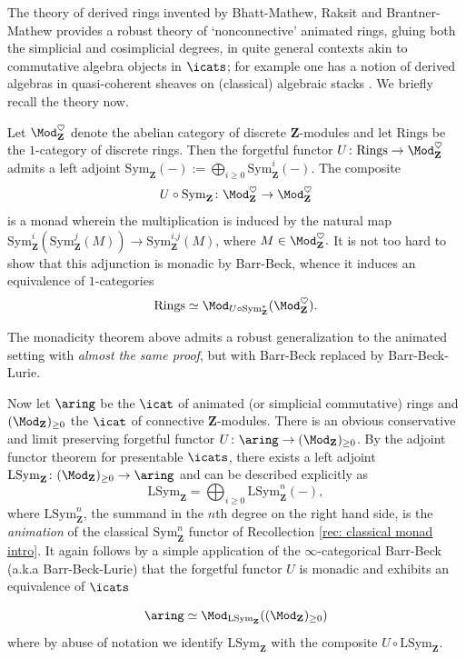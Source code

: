 \documentclass[10pt,reqno]{amsart}
\numberwithin{equation}{section}
\newcommand{\ZZ}{\mathbf{Z}}
\newcommand{\Sym}{\mathrm{Sym}}
\renewcommand{\L}{\mathrm{L}}
\begin{document}
The theory of derived rings invented by Bhatt-Mathew, Raksit \cite{Rak20} and Brantner-Mathew \cite{BrantnerMathewActa_toappear} provides a robust theory of `nonconnective' animated rings, gluing both the simplicial and cosimplicial degrees, in quite general contexts akin to commutative algebra objects in $\icats$; for example one has a notion of derived algebras in quasi-coherent sheaves on (classical) algebraic stacks \cite[Appendix A.2]{KubrakPrikhodko2024PadicHodgeArtinStacks}. We briefly recall the theory now.



\begin{recollection}\label{rec: classical monad intro}
    Let $\Mod_{\ZZ}^\heartsuit$ denote the abelian category of discrete $\ZZ$-modules and let $\mathrm{Rings}$ be the $1$-category of discrete rings. Then the forgetful functor $U\colon \mathrm{Rings}\to  \Mod_{\ZZ}^\heartsuit$ admits a left adjoint $\Sym_{\ZZ}(-):=\bigoplus_{i\geq 0} \Sym^i_{\ZZ}(-).$ 
    The composite $$U\circ \Sym_{\ZZ} \colon \Mod_{\ZZ}^\heartsuit\to \Mod_{\ZZ}^\heartsuit$$ is a monad wherein the multiplication is induced by the natural map $\Sym^i_{\ZZ}(\Sym_{\ZZ}^j(M))\to \Sym_{\ZZ}^{i.j}(M)$, where $M\in \Mod_{\ZZ}^\heartsuit.$
    It is not too hard to show that this adjunction is monadic by Barr-Beck, whence it induces an equivalence of $1$-categories 
    $$\mathrm{Rings}\simeq \Mod_{U\circ \Sym_{\ZZ}^*}(\Mod_{\ZZ}^\heartsuit).$$

\end{recollection}

The monadicity theorem above admits a robust generalization to the animated setting with \emph{almost the same proof}, but with Barr-Beck replaced by Barr-Beck-Lurie.

\begin{recollection}\label{rec: animated monadicity intro}
    Now let $\aring$ be the $\icat$ of animated (or simplicial commutative) rings and $(\Mod_\ZZ)_{\geq 0}$ the $\icat$ of connective $\ZZ$-modules. There is an obvious conservative and limit preserving forgetful functor $U\colon \aring \to (\Mod_\ZZ)_{\geq 0}$. By the adjoint functor theorem for presentable $\icats$, there exists a left adjoint $\L\Sym_{\ZZ}\colon (\Mod_\ZZ)_{\geq 0}\to \aring$ and can be described explicitly as $$\L\Sym_{\ZZ}=\bigoplus_{i\geq 0} \L\Sym^n_{\ZZ}(-),$$ where $\L\Sym^n_{\ZZ}$, the summand in the $n$th degree on the right hand side, is the \emph{animation} of the classical $\Sym_{\ZZ}^n$ functor of Recollection \ref{rec: classical monad intro}.
    It again follows by a simple application of the $\infty$-categorical Barr-Beck (a.k.a Barr-Beck-Lurie) that the forgetful functor $U$ is monadic and exhibits an equivalence of $\icats$

    $$\aring\simeq \Mod_{\L\Sym_{\ZZ}}((\Mod_\ZZ)_{\geq 0})$$ where by abuse of notation we identify $\L\Sym_\ZZ$ with the composite $U\circ \L\Sym_{\ZZ}.$
\end{recollection}
\end{document}
